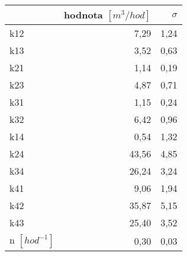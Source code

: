 \begin{tabular}{lrr}
\toprule
{} &  hodnota $\left[\si{m^3/hod}\right]$ &  $\sigma$ \\
\midrule
k12                 &                                 7,29 &      1,24 \\
k13                 &                                 3,52 &      0,63 \\
k21                 &                                 1,14 &      0,19 \\
k23                 &                                 4,87 &      0,71 \\
k31                 &                                 1,15 &      0,24 \\
k32                 &                                 6,42 &      0,96 \\
k14                 &                                 0,54 &      1,32 \\
k24                 &                                43,56 &      4,85 \\
k34                 &                                26,24 &      3,24 \\
k41                 &                                 9,06 &      1,94 \\
k42                 &                                35,87 &      5,15 \\
k43                 &                                25,40 &      3,52 \\
n $[\si{hod^{-1}}]$ &                                 0,30 &      0,03 \\
\bottomrule
\end{tabular}
